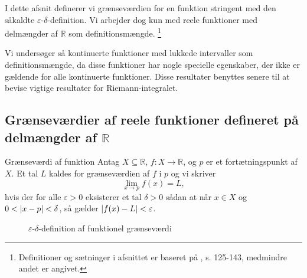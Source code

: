 I dette afsnit definerer vi grænseværdien for en funktion stringent med den såkaldte $\varepsilon $-$\delta $-definition.
Vi arbejder dog kun med reele funktioner med delmængder af $\mathbb{R}$ som definitionsmængde. \footnote{Definitioner og sætninger i afsnittet er baseret på \cite{Bartle2010}, s. 125-143, medmindre andet er angivet.}

Vi undersøger så kontinuerte funktioner med lukkede intervaller som definitionsmængde, da disse funktioner har nogle specielle egenskaber, der ikke er gældende for alle kontinuerte funktioner.
Disse resultater benyttes senere til at bevise vigtige resultater for Riemann-integralet.

\subsection{Grænseværdier af reele funktioner defineret på delmængder af $\mathbb{R}$}%
\label{sub:Grænseværdi}
\begin{definition}[label=def:grænseværdi]{Grænseværdi af funktion}{}
  Antag $X \subseteq \mathbb{R}$, $f:X \to \mathbb{R}$, og $p$ er et fortætningspunkt af $X$.
  Et tal $L$ kaldes for grænseværdien af $f$ i $p$ og vi skriver
  \[
  \lim_{x \to p} f(x)= L,
  \] 
  hvis der for alle $\varepsilon >0$ eksisterer et tal $\delta >0$ sådan at når $x \in X$ og $0<\abs{x-p} < \delta  $, så gælder $\abs{f(x)-L} <\varepsilon $.  
\end{definition}

\begin{figure}[H]
\begin{center}
\end{center}
\caption{$\varepsilon $-$\delta $-definition af funktionel grænseværdi}%
\label{fig:epsilondelta}
\end{figure}

